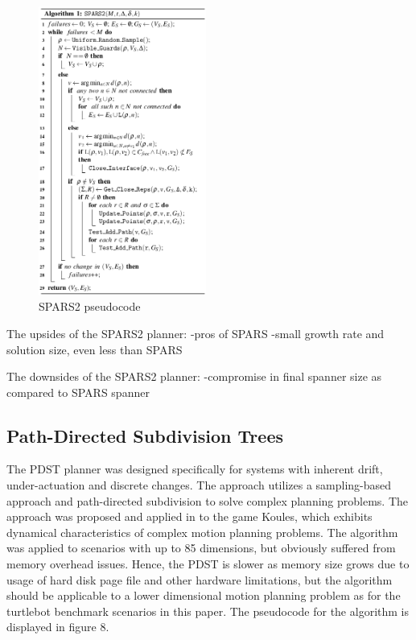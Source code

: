 \documentclass[conference]{IEEEtran} \usepackage[T1]{fontenc} \usepackage[backend=biber, style=ieee]{biblatex}
\begin{document}
\begin{figure}
\label{figure7} 
\centering 
\includegraphics[width=0.49\textwidth]{spars2}
\caption{SPARS2 pseudocode}
\end{figure}

The upsides of the SPARS2 planner:
-pros of SPARS
-small growth rate and solution size, even less than SPARS

The downsides of the SPARS2 planner:
-compromise in final spanner size as compared to SPARS spanner

\subsection{Path-Directed Subdivision Trees} \label{PDST}
The PDST planner was designed specifically for systems with inherent drift, under-actuation and discrete changes. The approach utilizes a sampling-based
approach and path-directed subdivision to solve complex planning problems. The approach was proposed and applied in \cite{pdst} to the game Koules, which exhibits 
dynamical characteristics of complex motion planning problems. The algorithm was applied to scenarios with up to 85 dimensions, but obviously suffered from
memory overhead issues. Hence, the PDST is slower as memory size grows due to usage of hard disk page file and other hardware limitations, but the algorithm
should be applicable to a lower dimensional motion planning problem as for the turtlebot benchmark scenarios in this paper. The pseudocode for the algorithm is displayed in figure 8.
\end{document}

